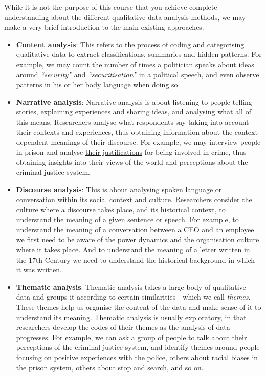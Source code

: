 \documentclass[
]{book}
\providecommand{\tightlist}{%
  \setlength{\itemsep}{0pt}\setlength{\parskip}{0pt}}
\begin{document}
While it is not the purpose of this course that you achieve complete understanding about the different qualitative data analysis methods, we may make a very brief introduction to the main existing approaches.

\begin{itemize}
\tightlist
\item
  \textbf{Content analysis}: This refers to the process of coding and categorising qualitative data to extract classifications, summaries and hidden patterns. For example, we may count the number of times a politician speaks about ideas around \emph{``security''} and \emph{``securitisation''} in a political speech, and even observe patterns in his or her body language when doing so.
\item
  \textbf{Narrative analysis}: Narrative analysis is about listening to people telling stories, explaining experiences and sharing ideas, and analysing what all of this means. Researchers analyse what respondents say taking into account their contexts and experiences, thus obtaining information about the context-dependent meanings of their discourse. For example, we may interview people in prison and analyse \href{https://en.wikipedia.org/wiki/Techniques_of_neutralization}{their justifications} for being involved in crime, thus obtaining insights into their views of the world and perceptions about the criminal justice system.
\item
  \textbf{Discourse analysis}: This is about analysing spoken language or conversation within its social context and culture. Researchers consider the culture where a discourse takes place, and its historical context, to understand the meaning of a given sentence or speech. For example, to understand the meaning of a conversation between a CEO and an employee we first need to be aware of the power dynamics and the organisation culture where it takes place. And to understand the meaning of a letter written in the 17th Century we need to understand the historical background in which it was written.
\item
  \textbf{Thematic analysis}: Thematic analysis takes a large body of qualitative data and groups it according to certain similarities - which we call \emph{themes}. These themes help us organise the content of the data and make sense of it to understand its meaning. Thematic analysis is usually exploratory, in that researchers develop the codes of their themes as the analysis of data progresses. For example, we can ask a group of people to talk about their perceptions of the criminal justice system, and identify themes around people focusing on positive experiences with the police, others about racial biases in the prison system, others about stop and search, and so on.

\end{itemize}
\end{document}
